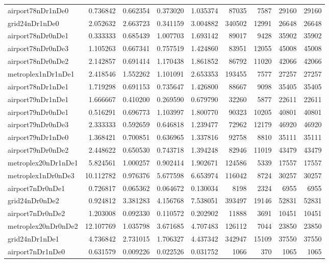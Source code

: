 \begin{longtable}{|l|r|r|r|r|r|r|r|r|}
airport78nDr1nDe0 & 0.736842 & 0.662354 & 0.373020 & 1.035374 & 87035 & 7587 & 29160 & 29160 \\
grid24nDr1nDe0 & 2.052632 & 2.663723 & 0.341159 & 3.004882 & 340502 & 12991 & 26648 & 26648 \\
airport78nDr0nDe1 & 0.333333 & 0.685439 & 1.007703 & 1.693142 & 89017 & 9428 & 35902 & 35902 \\
airport78nDr0nDe3 & 1.105263 & 0.667341 & 0.757519 & 1.424860 & 83951 & 12055 & 45008 & 45008 \\
airport78nDr0nDe2 & 2.142857 & 0.691414 & 1.170438 & 1.861852 & 86792 & 11020 & 42066 & 42066 \\
metroplex1nDr1nDe1 & 2.418546 & 1.552262 & 1.101091 & 2.653353 & 193455 & 7577 & 27257 & 27257 \\
airport78nDr1nDe1 & 1.719298 & 0.691153 & 0.735647 & 1.426800 & 88667 & 9098 & 35405 & 35405 \\
airport79nDr1nDe1 & 1.666667 & 0.410200 & 0.269590 & 0.679790 & 32260 & 5877 & 22611 & 22611 \\
airport79nDr0nDe1 & 0.516291 & 0.696773 & 1.103997 & 1.800770 & 90323 & 10205 & 40801 & 40801 \\
airport79nDr0nDe3 & 2.333333 & 0.592659 & 0.646818 & 1.239477 & 72962 & 12179 & 46920 & 46920 \\
airport79nDr1nDe0 & 1.368421 & 0.700851 & 0.636965 & 1.337816 & 92758 & 8810 & 35111 & 35111 \\
airport79nDr0nDe2 & 2.448622 & 0.650530 & 0.743718 & 1.394248 & 82946 & 11019 & 43479 & 43479 \\
metroplex20nDr1nDe1 & 5.824561 & 1.000257 & 0.902414 & 1.902671 & 124586 & 5339 & 17557 & 17557 \\
metroplex1nDr0nDe3 & 10.112782 & 0.976376 & 5.677598 & 6.653974 & 116042 & 8724 & 30257 & 30257 \\
airport7nDr0nDe1 & 0.726817 & 0.065362 & 0.064672 & 0.130034 & 8198 & 2324 & 6955 & 6955 \\
grid24nDr0nDe2 & 0.924812 & 3.381283 & 4.156768 & 7.538051 & 393497 & 19146 & 52831 & 52831 \\
airport7nDr0nDe2 & 1.203008 & 0.092330 & 0.110572 & 0.202902 & 11888 & 3691 & 10451 & 10451 \\
metroplex20nDr0nDe2 & 12.107769 & 1.035798 & 3.671685 & 4.707483 & 126112 & 7044 & 23850 & 23850 \\
grid24nDr1nDe1 & 4.736842 & 2.731015 & 1.706327 & 4.437342 & 342947 & 15109 & 37550 & 37550 \\
airport7nDr1nDe0 & 0.631579 & 0.009226 & 0.022526 & 0.031752 & 1066 & 370 & 1065 & 1065 \\

\end{longtable}
